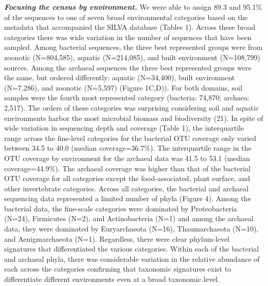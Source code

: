 \documentclass[11pt,]{article}
\begin{document}
\textbf{\emph{Focusing the census by environment.}} We were able to
assign 89.3 and 95.1\% of the sequences to one of seven broad
environmental categories based on the metadata that accompanied the
SILVA database (Tables 1). Across these broad categories there was wide
variation in the number of sequences that have been sampled. Among
bacterial sequences, the three best represented groups were from
zoonotic (N=804,585), aquatic (N=214,085), and built environment
(N=108,799) sources. Among the archaeal sequences the three best
represented groups were the same, but ordered differently: aquatic
(N=34,400), built environment (N=7,286), and zoonotic (N=5,597) (Figure
1C,D)). For both domains, soil samples were the fourth most represented
category (bacteria: 74,870; archaea: 2,517). The orders of these
categories was surprising considering soil and aquatic environments
harbor the most microbial biomass and biodiversity (21). In spite of
wide variation in sequencing depth and coverage (Table 1), the
interquartile range across the fine-level categories for the bacterial
OTU coverage only varied between 34.5 to 40.0 (median coverage=36.7\%).
The interquartile range in the OTU coverage by environment for the
archaeal data was 41.5 to 53.1 (median coverage=44.9\%). The archaeal
coverage was higher than that of the bacterial OTU coverage for all
categories except the food-associated, plant surface, and other
invertebrate categories. Across all categories, the bacterial and
archaeal sequencing data represented a limited number of phyla (Figure
4). Among the bacterial data, the fine-scale categories were dominated
by Proteobacteria (N=24), Firmicutes (N=2), and Actinobacteria (N=1) and
among the archaeal data, they were dominated by Euryarchaeota (N=16),
Thaumarchaeota (N=10), and Aenigmarchaeota (N=1). Regardless, there were
clear phylum-level signatures that differentiated the various
categories. Within each of the bacterial and archaeal phyla, there was
considerable variation in the relative abundance of each across the
categories confirming that taxonomic signatures exist to differentiate
different environments even at a broad taxonomic level.
\end{document}
